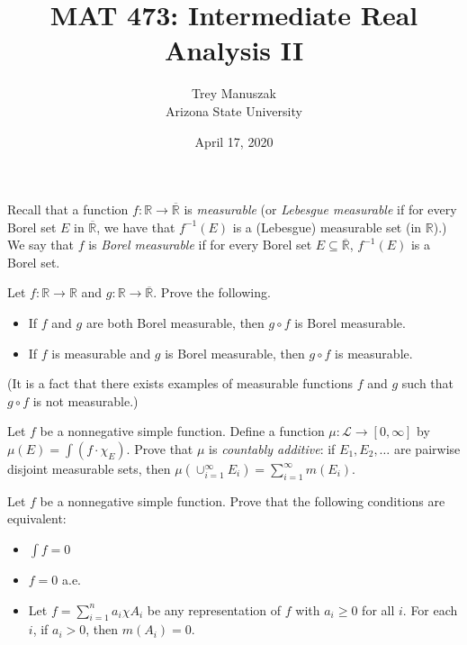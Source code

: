 \documentclass[12pt]{article}
\title{MAT 473: Intermediate Real Analysis II}
\date{April 17, 2020}
\author{Trey Manuszak\\ Arizona State University}
\newenvironment{problem}[2][Problem]{\begin{trivlist}
\item[\hskip \labelsep {\bfseries #1}\hskip \labelsep {\bfseries
#2.}]}{\end{trivlist}}
\begin{document}


\maketitle
\newpage


\begin{problem}{45}
  Recall that a function $f : \mathbb{R} \to \overline{\mathbb{R}}$ is \textit{measurable} (or \textit{Lebesgue measurable} if for every Borel set $E$ in $\overline{\mathbb{R}}$, we have that $f^{-1}(E)$ is a (Lebesgue) measurable set (in $\mathbb{R}$).) We say that $f$ is \textit{Borel measurable} if for every Borel set $E \subseteq \overline{\mathbb{R}}$, $f^{-1}(E)$ is a Borel set.

  Let $f : \mathbb{R} \to \mathbb{R}$ and $g : \mathbb{R} \to \overline{\mathbb{R}}$. Prove the following. 
  \begin{itemize}
    \item[(a)] If $f$ and $g$ are both Borel measurable, then $g \circ f$ is Borel measurable.
    \item[(b)] If $f$ is measurable and $g$ is Borel measurable, then $g \circ f$ is measurable.
  \end{itemize}
  (It is a fact that there exists examples of measurable functions $f$ and $g$ such that $g \circ f$ is not measurable.)
\end{problem}

\begin{problem}{46}
  Let $f$ be a nonnegative simple function. Define a function $\mu : \mathcal{L} \to [0,\infty]$ by $\mu(E) = \int(f \cdot \chi_E)$. Prove that $\mu$ is \textit{countably additive}: if $E_1, E_2, \dots$ are pairwise disjoint measurable sets, then $\mu(\cup_{i = 1}^{\infty}E_i) = \sum_{i = 1}^{\infty}m(E_i)$.
\end{problem}

\begin{problem}{47}
  Let $f$ be a nonnegative simple function. Prove that the following conditions are equivalent:
  \begin{itemize}
    \item[(a)] $\int f = 0$
    \item[(b)] $f = 0$ a.e.
    \item[(c)] Let $f = \sum_{i = 1}^{n}a_i\chi A_i$ be any representation of $f$ with $a_i \geq 0$ for all $i$. For each $i$, if $a_i > 0$, then $m(A_i) = 0$.  
  \end{itemize}
\end{problem}
\end{document}
